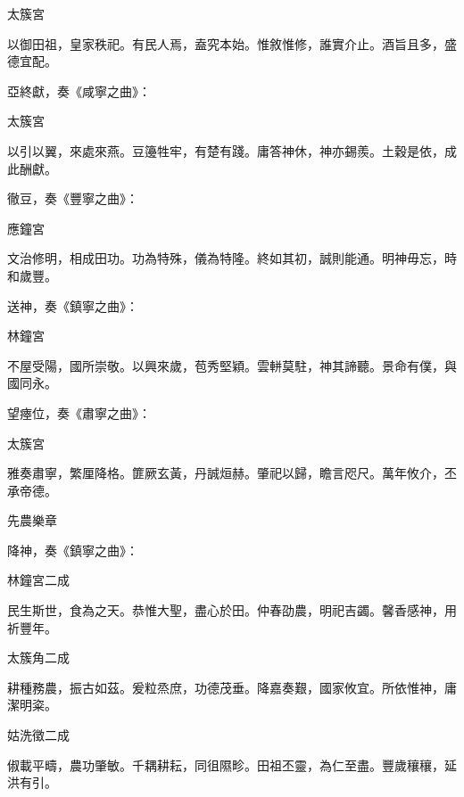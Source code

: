 \begin{pinyinscope}
 太簇宮



 以御田祖，皇家秩祀。有民人焉，盍究本始。惟敘惟修，誰實介止。酒旨且多，盛德宜配。



 亞終獻，奏《咸寧之曲》：



 太簇宮



 以引以翼，來處來燕。豆籩牲牢，有楚有踐。庸答神休，神亦錫羨。土穀是依，成此酬獻。



 徹豆，奏《豐寧之曲》：



 應鐘宮



 文治修明，相成田功。功為特殊，儀為特隆。終如其初，誠則能通。明神毋忘，時和歲豐。



 送神，奏《鎮寧之曲》：



 林鐘宮



 不屋受陽，國所崇敬。以興來歲，苞秀堅穎。雲軿莫駐，神其諦聽。景命有僕，與國同永。



 望瘞位，奏《肅寧之曲》：



 太簇宮



 雅奏肅寧，繁厘降格。篚厥玄黃，丹誠烜赫。肇祀以歸，瞻言咫尺。萬年攸介，丕承帝德。



 先農樂章



 降神，奏《鎮寧之曲》：



 林鐘宮二成



 民生斯世，食為之天。恭惟大聖，盡心於田。仲春劭農，明祀吉蠲。馨香感神，用祈豐年。



 太簇角二成



 耕種務農，振古如茲。爰粒烝庶，功德茂垂。降嘉奏艱，國家攸宜。所依惟神，庸潔明粢。



 姑洗徵二成



 俶載平疇，農功肇敏。千耦耕耘，同徂隰畛。田祖丕靈，為仁至盡。豐歲穰穰，延洪有引。




\end{pinyinscope}
